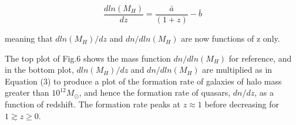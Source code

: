 \documentclass[12pt, twocolumn]{revtex4}    %
\begin{document}
\begin{equation}
    \frac{dln(M_H)}{dz}=\frac{\bar a}{(1+z)}-\bar b
\end{equation}

\noindent meaning that $dln(M_H)/dz$ and $dn/dln(M_H)$ are now functions of z only.\par

The top plot of Fig.6 shows the mass function $dn/dln(M_H)$ for reference, and in the bottom plot, $dln(M_H)/dz$ and $dn/dln(M_H)$ are multiplied as in Equation (3) to produce a plot of the formation rate of galaxies of halo mass greater than $10^{12}M_\odot$, and hence the formation rate of quasars, $dn/dz$, as a function of redshift. The formation rate peaks at $z\approx1$ before decreasing for $1 \gtrsim z \geq 0$.

\onecolumngrid
\end{document}
